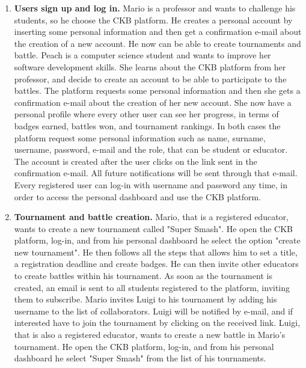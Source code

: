 \begin{enumerate}[label=\textbf{SC.\arabic*}]
    \item {} \textbf{Users sign up and log in.} \newline
    Mario is a professor and wants to challenge his students, so he choose the CKB platform. He creates a personal account by inserting some personal information and then get a confirmation e-mail about the creation of a new account. He now can be able to create tournaments and battle. \newline
    Peach is a computer science student and wants to improve her software development skills. She learns about the CKB platform from her professor, and decide to create an account to be able to participate to the battles. The platform requests some personal information and then she gets a confirmation e-mail about the creation of her new account. She now have a personal profile where every other user can see her progress, in terms of badges earned, battles won, and tournament rankings. \newline
    In both cases the platform request some personal information such as name, surname, username, password, e-mail and the role, that can be student or educator. The account is created after the user clicks on the link sent in the confirmation e-mail. All future notifications will be sent through that e-mail. \newline
    Every registered user can log-in with username and password any time, in order to access the personal dashboard and use the CKB platform.
    \item {} \textbf{Tournament and battle creation.} \newline
    Mario, that is a registered educator, wants to create a new tournament called "Super Smash". He open the CKB platform, log-in, and from his personal dashboard he select the option "create new tournament". He then follows all the steps that allows him to set a title, a registration deadline and create badges. He can then invite other educators to create battles within his tournament. As soon as the tournament is created, an email is sent to all students registered to the platform, inviting them to subscribe. \newline
    Mario invites Luigi to his tournament by adding his username to the list of collaborators. Luigi will be notified by e-mail, and if interested have to join the tournament by clicking on the received link. \newline
    Luigi, that is also a registered educator, wants to create a new battle in Mario's tournament. He open the CKB platform, log-in, and from his personal dashboard he select "Super Smash" from the list of his tournaments.

\end{enumerate}
